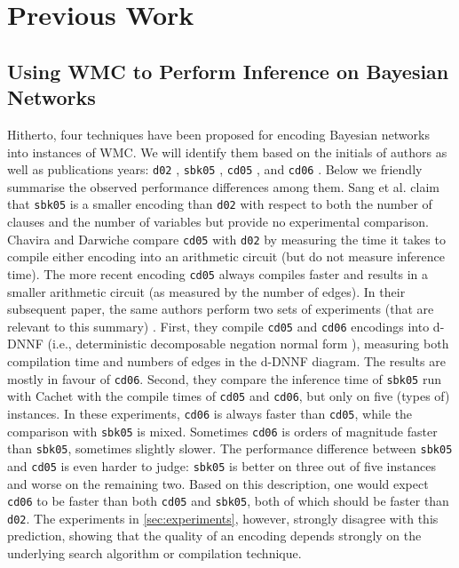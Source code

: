 \documentclass{article}
\theoremstyle{definition}
\theoremstyle{remark}
\begin{document}
\section{Previous Work}

\subsection{Using WMC to Perform Inference on Bayesian Networks}

Hitherto, four techniques have been proposed for encoding Bayesian networks into
instances of WMC. We will identify them based on the initials of authors as well
as publications years: \texttt{d02} \cite{DBLP:conf/kr/Darwiche02},
\texttt{sbk05} \cite{DBLP:conf/aaai/SangBK05}, \texttt{cd05}
\cite{DBLP:conf/ijcai/ChaviraD05}, and \texttt{cd06}
\cite{DBLP:conf/sat/ChaviraD06}. Below we friendly summarise the observed
performance differences among them. Sang et al. \cite{DBLP:conf/aaai/SangBK05}
claim that \texttt{sbk05} is a smaller encoding than \texttt{d02} with respect
to both the number of clauses and the number of variables but provide no
experimental comparison. Chavira and Darwiche \cite{DBLP:conf/ijcai/ChaviraD05}
compare \texttt{cd05} with \texttt{d02} by measuring the time it takes to
compile either encoding into an arithmetic circuit (but do not measure inference
time). The more recent encoding \texttt{cd05} always compiles faster and results
in a smaller arithmetic circuit (as measured by the number of edges). In their
subsequent paper, the same authors perform two sets of experiments (that are
relevant to this summary) \cite{DBLP:conf/sat/ChaviraD06}. First, they compile
\texttt{cd05} and \texttt{cd06} encodings into d-DNNF (i.e., deterministic
decomposable negation normal form \cite{DBLP:journals/jancl/Darwiche01}),
measuring both compilation time and numbers of edges in the d-DNNF diagram. The
results are mostly in favour of \texttt{cd06}. Second, they compare the
inference time of \texttt{sbk05} run with Cachet \cite{DBLP:conf/sat/SangBBKP04}
with the compile times of \texttt{cd05} and \texttt{cd06}, but only on five
(types of) instances. In these experiments, \texttt{cd06} is always faster than
\texttt{cd05}, while the comparison with \texttt{sbk05} is mixed. Sometimes
\texttt{cd06} is orders of magnitude faster than \texttt{sbk05}, sometimes
slightly slower. The performance difference between \texttt{sbk05} and
\texttt{cd05} is even harder to judge: \texttt{sbk05} is better on three out of
five instances and worse on the remaining two. Based on this description, one
would expect \texttt{cd06} to be faster than both \texttt{cd05} and
\texttt{sbk05}, both of which should be faster than \texttt{d02}. The
experiments in \cref{sec:experiments}, however, strongly disagree with this
prediction, showing that the quality of an encoding depends strongly on the
underlying search algorithm or compilation technique.
\end{document}
